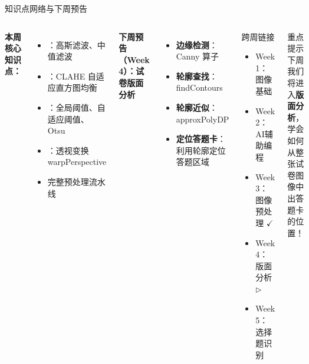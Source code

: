 
\begin{frame}{知识点网络与下周预告}
    \begin{columns}
        \textbf{本周核心知识点：}
        \begin{itemize}
            \item {}：高斯滤波、中值滤波
            \item {}：CLAHE 自适应直方图均衡
            \item {}：全局阈值、自适应阈值、Otsu
            \item {}：透视变换 warpPerspective
            \item 完整预处理流水线
        \end{itemize}

        \vspace{0.3cm}
        \textbf{下周预告（Week 4）：试卷版面分析}
        \begin{itemize}
            \item \textbf{边缘检测}：Canny 算子
            \item \textbf{轮廓查找}：findContours
            \item \textbf{轮廓近似}：approxPolyDP
            \item \textbf{定位答题卡}：利用轮廓定位答题区域
        \end{itemize}

        \begin{block}{跨周链接}
            \begin{itemize}
                \item Week 1：图像基础
                \item Week 2：AI辅助编程
                \item Week 3：图像预处理 $\checkmark$
                \item Week 4：版面分析 $\triangleright$
                \item Week 5：选择题识别
            \end{itemize}
        \end{block}

        \vspace{0.3cm}
        \begin{alertblock}{重点提示}
            下周我们将进入\textbf{版面分析}，学会如何从整张试卷图像中出答题卡的位置！
        \end{alertblock}
    \end{columns}
\end{frame}

